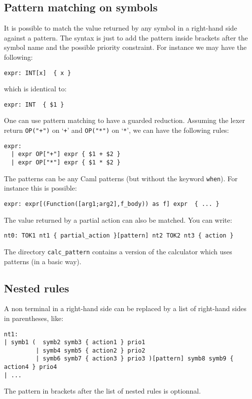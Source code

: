 \documentclass[12pt]{article}
\begin{document}
{\subsection{Pattern matching on symbols}\label{pattern}

It is possible to match the value returned by any symbol in a right-hand side against a pattern. The syntax is just to add the pattern inside brackets after the symbol name and the possible priority constraint. For instance we may have the following:
\begin{verbatim}
expr: INT[x]  { x }
\end{verbatim}
which is identical to:
\begin{verbatim}
expr: INT  { $1 }
\end{verbatim}
One can use pattern matching to have a guarded reduction. Assuming the lexer return \texttt{OP("+")} on   `\texttt{+}' and \texttt{OP("*")} on `\texttt{*}', we can have the following rules:
\begin{verbatim}
expr:
  | expr OP["+"] expr { $1 + $2 }
  | expr OP["*"] expr { $1 * $2 }
\end{verbatim}

The patterns can be any Caml patterns (but without the keyword \verb|when|). For instance this is possible:
\begin{verbatim}
expr: expr[(Function([arg1;arg2],f_body)) as f] expr  { ... }
\end{verbatim}

The value returned by a partial action can also be matched. You can write:
\begin{verbatim}
nt0: TOK1 nt1 { partial_action }[pattern] nt2 TOK2 nt3 { action }
\end{verbatim}

The directory \texttt{calc\_pattern} contains a version of the calculator which uses patterns (in a basic way).

\subsection{Nested rules}

A non terminal in a right-hand side can be replaced by a list of right-hand sides in parentheses, like:
\begin{verbatim}
nt1:
| symb1 (  symb2 symb3 { action1 } prio1
         | symb4 symb5 { action2 } prio2
         | symb6 symb7 { action3 } prio3 )[pattern] symb8 symb9 { action4 } prio4
| ...
\end{verbatim}
The pattern in brackets after the list of nested rules is optionnal.

}
\end{document}

